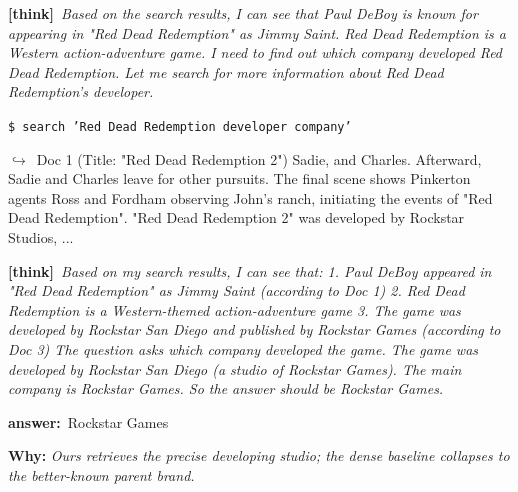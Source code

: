 \documentclass{llmxive}
\providecommand{\winbadge}{\colorbox{green!50!black}{\scriptsize\bfseries\,WIN\,}}
\providecommand{\thk}[1]{{\footnotesize\textbf{[think]}\ \textit{#1}\par}}
\providecommand{\cmd}[1]{{\footnotesize\texttt{\$\ #1}\par}}
\providecommand{\retr}[1]{{\footnotesize\quad$\hookrightarrow$\ #1\par}}
\providecommand{\ans}[1]{{\footnotesize\textbf{answer:}\ #1\par}}
\begin{document}
\begin{cmpbox}[label={ex:hotpot-rockstar},title={\winbadge\ \ \textsc{HotpotQA -- entity precision (subsidiary vs.\ parent)}}]
  \thk{Based on the search results, I can see that Paul DeBoy is known for appearing in "Red Dead Redemption" as Jimmy Saint. Red Dead Redemption is a Western action-adventure game. I need to find out which company developed Red Dead Redemption. Let me search for more information about Red Dead Redemption's developer.}
  \cmd{search 'Red Dead Redemption developer company'}
  \retr{Doc 1 (Title: "Red Dead Redemption 2") Sadie, and Charles. Afterward, Sadie and Charles leave for other pursuits. The final scene shows Pinkerton agents Ross and Fordham observing John's ranch, initiating the events of "Red Dead Redemption". "Red Dead Redemption 2" was developed by Rockstar Studios, ...}
  \thk{Based on my search results, I can see that: 1. Paul DeBoy appeared in "Red Dead Redemption" as Jimmy Saint (according to Doc 1) 2. Red Dead Redemption is a Western-themed action-adventure game 3. The game was developed by Rockstar San Diego and published by Rockstar Games (according to Doc 3) The question asks which company developed the game. The game was developed by Rockstar San Diego (a studio of Rockstar Games). The main company is Rockstar Games. So the answer should be Rockstar Games.}
  \ans{Rockstar Games}
\smallskip\par\textbf{Why:} \textit{Ours retrieves the precise developing studio; the dense baseline collapses to the better-known parent brand.}
\end{cmpbox}\bigskip
\end{document}
